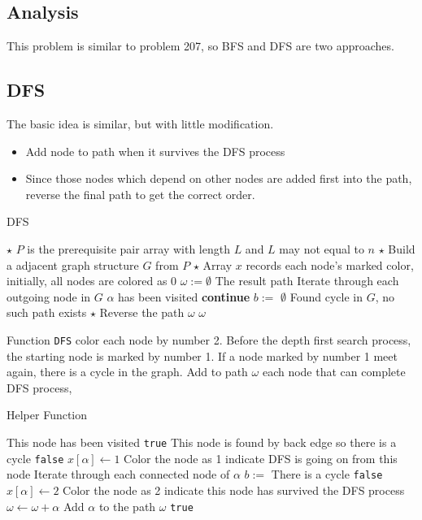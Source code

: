 \subsection{Analysis}
This problem is similar to problem 207, so BFS and DFS are two approaches.
\subsection{DFS}
The basic idea is similar, but with little modification. 
\begin{itemize}
    \item Add node to path when it survives the DFS process
    \item Since those nodes which depend on other nodes are added first into the path, reverse the final path to get the correct order.
\end{itemize}
\setcounter{algorithm}{0}
\begin{algorithm}[H]
\caption{DFS}
\begin{algorithmic}[1]
\State $\star$ $P$ is the prerequisite pair array with length $L$ and $L$ may not equal to $n$
\State $\star$ Build a adjacent graph structure $G$ from $P$
\State $\star$ Array $x$ records each node's marked color, initially, all nodes are colored as 0
\State $\omega:=\emptyset$ \Comment The result path
 \Comment Iterate through each outgoing node in $G$
 \Comment $\alpha$ has been visited
\State \textbf{continue}
\EndIf
\State $b:=$ 
\State \Return $\emptyset$ \Comment Found cycle in $G$, no such path exists
\EndIf
\EndFor
\State $\star$ Reverse the path $\omega$
\State \Return $\omega$
\EndProcedure
\end{algorithmic}
\end{algorithm}
Function \texttt{DFS} color each node by number 2. Before the depth first search process, the starting node is marked by number 1. If a node marked by number 1 meet again, there is a cycle in the graph. Add to path $\omega$ each node that can complete DFS process, 
\begin{algorithm}[H]
\caption{Helper Function}
\begin{algorithmic}[1]
 \Comment This node has been visited
\State \Return \texttt{true}
\EndIf
{} \Comment This node is found by back edge so there is a cycle
\State \Return \texttt{false}
\EndIf
\State $x[\alpha]\gets 1$ \Comment Color the node as 1 indicate DFS is going on from this node
 \Comment Iterate through each connected node of $\alpha$
\State $b:=$ 
 \Comment There is a cycle
\State \Return \texttt{false}
\EndIf
\EndFor
\State $x[\alpha]\gets 2$ \Comment Color the node as 2 indicate this node has survived the DFS process
\State $\omega\gets\omega+\alpha$ \Comment Add $\alpha$ to the path $\omega$
\State \Return \texttt{true}
\EndFunction
\end{algorithmic}
\end{algorithm}
